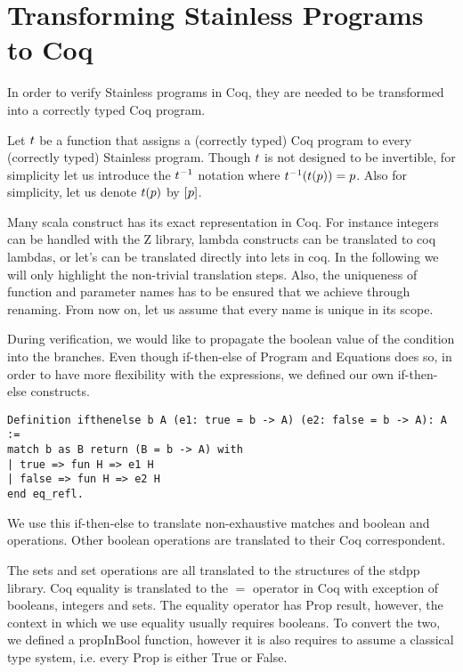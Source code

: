 \section{Transforming Stainless Programs to Coq}
\label{sect:trans}

In order to verify Stainless programs in Coq, they are needed to be transformed into a correctly typed Coq program.

\begin{definition}
	Let $t$ be a function that assigns a (correctly typed) Coq program to every (correctly typed) Stainless program. Though $t$ is not designed to be invertible, for simplicity let us introduce the $t^{-1}$ notation where $t^{-1}(t(p)) = p$. Also for simplicity, let us denote $t(p)$ by $[p]$.
\end{definition}

Many scala construct has its exact representation in Coq. For instance integers can be handled with the Z library, lambda constructs can be translated to coq lambdas, or let's can be translated directly into lets in coq. In the following we will only highlight the non-trivial translation steps. Also, the uniqueness of function and parameter names has to be ensured that we achieve through renaming. From now on, let us assume that every name is unique in its scope.

During verification, we would like to propagate the boolean value of the condition into the branches. Even though if-then-else of Program and Equations does so, in order to have more flexibility with the expressions, we defined our own if-then-else constructs.

\begin{lstlisting}[style=myCoqstyle]
Definition ifthenelse b A (e1: true = b -> A) (e2: false = b -> A): A :=
match b as B return (B = b -> A) with
| true => fun H => e1 H
| false => fun H => e2 H
end eq_refl.
\end{lstlisting}

We use this if-then-else to translate non-exhaustive matches and boolean and operations. Other boolean operations are translated to their Coq correspondent.

The sets and set operations are all translated to the structures of the stdpp library. Coq equality is translated to the $=$ operator in Coq with exception of booleans, integers and sets. The equality operator has Prop result, however, the context in which we use equality usually requires booleans. To convert the two, we defined a propInBool function, however it is also requires to assume a classical type system, i.e. every Prop is either True or False.

